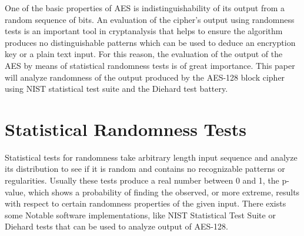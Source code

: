 \documentclass[conference]{IEEEtran}
\begin{document}
One of the basic properties of AES is indistinguishability of its output from a random sequence of bits. An evaluation of the cipher's output using randomness tests is an important tool in cryptanalysis that helps to ensure the algorithm produces no distinguishable patterns which can be used to deduce an encryption key or a plain text input. For this reason, the evaluation of the output of the AES by means of statistical randomness tests is of great importance. This paper will analyze randomness
of the output produced by the AES-128 block cipher using NIST statistical test suite and  the Diehard test battery.
\section{Statistical Randomness Tests}

Statistical tests for randomness take arbitrary length input sequence and analyze its distribution to see if it is random and contains no recognizable patterns or regularities. Usually these tests produce a real number between 0 and 1, the p-value, which shows a probability of finding the observed, or more extreme, results with respect to certain randomness properties of the given input. There exists some Notable software implementations, like NIST Statistical Test Suite or Diehard tests that can be used to analyze output of AES-128. 
\end{document}
